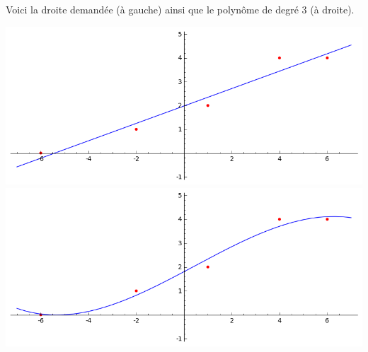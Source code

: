 \documentclass[class=report,crop=false]{standalone}
\begin{document}
Voici la droite demandée (à gauche) ainsi que le polynôme de degré $3$ (à droite).
\begin{center}
    \includegraphics[scale=0.35]{figures/moindres_carres1}\quad
    \includegraphics[scale=0.35]{figures/moindres_carres2}
\end{center} 
  
\end{document}
